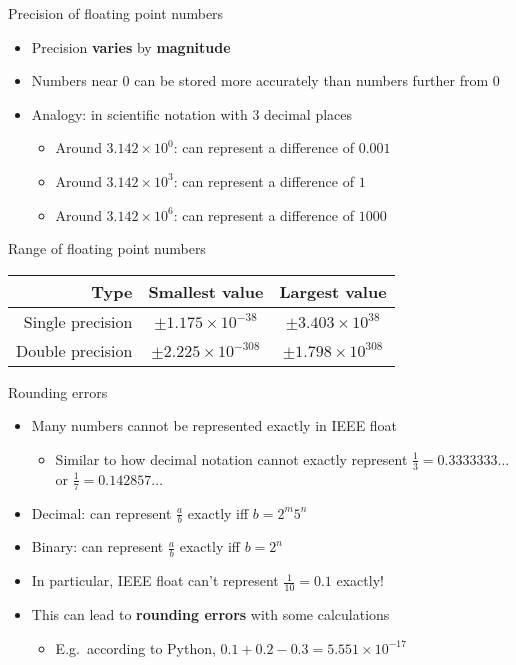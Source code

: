 \begin{frame}{Precision of floating point numbers}
	\begin{itemize}
		\pause\item Precision \textbf{varies} by \textbf{magnitude}
		\pause\item Numbers near 0 can be stored more accurately than numbers further from 0
		\pause\item Analogy: in scientific notation with 3 decimal places
			\begin{itemize}
				\pause\item Around $3.142 \times 10^0$: can represent a difference of $0.001$
				\pause\item Around $3.142 \times 10^3$: can represent a difference of $1$
				\pause\item Around $3.142 \times 10^6$: can represent a difference of $1000$
			\end{itemize}
	\end{itemize}
\end{frame}

\begin{frame}[fragile]{Range of floating point numbers}
	\begin{center}
		\begin{tabular}{|r|cc|}
			\hline
			Type & Smallest value & Largest value \\\hline
			Single precision & $\pm 1.175 \times 10^{-38}$ & $\pm 3.403 \times 10^{38}$ \\\hline
			Double precision & $\pm 2.225 \times 10^{-308}$ & $\pm 1.798 \times 10^{308}$ \\\hline
		\end{tabular}
	\end{center}
\end{frame}

\begin{frame}{Rounding errors}
	\begin{itemize}
		\pause\item Many numbers cannot be represented exactly in IEEE float
			\begin{itemize}
				\pause\item Similar to how decimal notation cannot exactly represent
					$\frac13 = 0.3333333\dots$ or $\frac17 = 0.142857\dots$
			\end{itemize}
		\pause\item Decimal: can represent $\frac{a}{b}$ exactly iff $b = 2^m 5^n$
		\pause\item Binary: can represent $\frac{a}{b}$ exactly iff $b = 2^n$
		\pause\item In particular, IEEE float can't represent $\frac{1}{10} = 0.1$ exactly!
		\pause\item This can lead to \textbf{rounding errors} with some calculations
			\begin{itemize}
				\pause\item E.g.\ according to Python,
					$0.1 + 0.2 - 0.3 = 5.551 \times 10^{-17}$
			\end{itemize}
	\end{itemize}
\end{frame}

